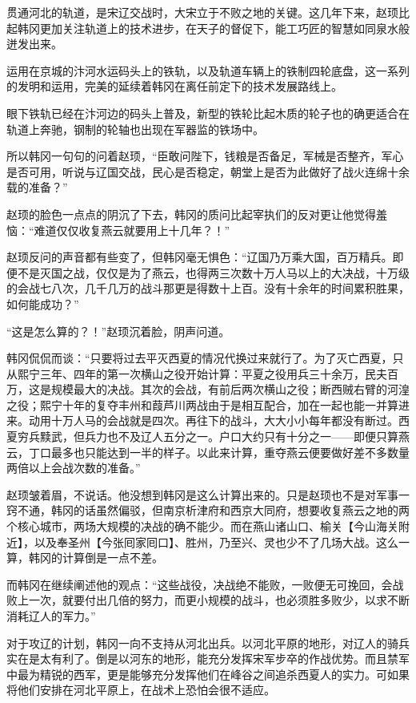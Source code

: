 贯通河北的轨道，是宋辽交战时，大宋立于不败之地的关键。这几年下来，赵顼比起韩冈更加关注轨道上的技术进步，在天子的督促下，能工巧匠的智慧如同泉水般迸发出来。

运用在京城的汴河水运码头上的铁轨，以及轨道车辆上的铁制四轮底盘，这一系列的发明和运用，完美的延续着韩冈在离任前定下的技术发展路线上。

眼下铁轨已经在汴河边的码头上普及，新型的铁轮比起木质的轮子也的确更适合在轨道上奔驰，钢制的轮轴也出现在军器监的铁场中。

所以韩冈一句句的问着赵顼，“臣敢问陛下，钱粮是否备足，军械是否整齐，军心是否可用，听说与辽国交战，民心是否稳定，朝堂上是否为此做好了战火连绵十余载的准备？”

赵顼的脸色一点点的阴沉了下去，韩冈的质问比起宰执们的反对更让他觉得羞恼：“难道仅仅收复燕云就要用上十几年？！”

赵顼反问的声音都有些变了，但韩冈毫无惧色：“辽国乃万乘大国，百万精兵。即便不是灭国之战，仅仅是为了燕云，也得两三次数十万人马以上的大决战，十万级的会战七八次，几千几万的战斗那更是得数十上百。没有十余年的时间累积胜果，如何能成功？”

“这是怎么算的？！”赵顼沉着脸，阴声问道。

韩冈侃侃而谈：“只要将过去平灭西夏的情况代换过来就行了。为了灭亡西夏，只从熙宁三年、四年的第一次横山之役开始计算：平夏之役用兵三十余万，民夫百万，这是规模最大的决战。其次的会战，有前后两次横山之役；断西贼右臂的河湟之役；熙宁十年的复夺丰州和葭芦川两战由于是相互配合，加在一起也能一并算进来。动用十万人马的会战就是四次。再往下的战斗，大大小小每年都没有断过。西夏穷兵黩武，但兵力也不及辽人五分之一。户口大约只有十分之一——即便只算燕云，丁口最多也只能达到一半的样子。以此来计算，重夺燕云便要做好差不多数量两倍以上会战次数的准备。”

赵顼皱着眉，不说话。他没想到韩冈是这么计算出来的。只是赵顼也不是对军事一窍不通，韩冈的话虽然偏驳，但南京析津府和西京大同府，想要收复燕云之地的两个核心城市，两场大规模的决战的确不能少。而在燕山诸山口、榆关【今山海关附近】，以及奉圣州【今张囘家囘口】、胜州，乃至兴、灵也少不了几场大战。这么一算，韩冈的计算倒是一点不差。

而韩冈在继续阐述他的观点：“这些战役，决战绝不能败，一败便无可挽回，会战败上一次，就要付出几倍的努力，而更小规模的战斗，也必须胜多败少，以求不断消耗辽人的军力。”

对于攻辽的计划，韩冈一向不支持从河北出兵。以河北平原的地形，对辽人的骑兵实在是太有利了。倒是以河东的地形，能充分发挥宋军步卒的作战优势。而且禁军中最为精锐的西军，更是能够充分发挥他们在峰谷之间追杀西夏人的实力。可如果将他们安排在河北平原上，在战术上恐怕会很不适应。

